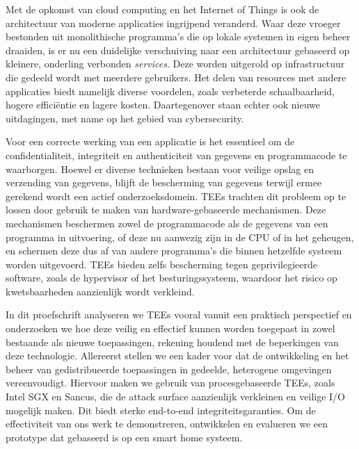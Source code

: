 Met de opkomst van cloud computing en het Internet of Things is ook de
architectuur van moderne applicaties ingrijpend veranderd. Waar deze vroeger
bestonden uit monolithische programma's die op lokale systemen in eigen beheer
draaiden, is er nu een duidelijke verschuiving naar een architectuur gebaseerd
op kleinere, onderling verbonden \emph{services}. Deze worden uitgerold op
infrastructuur die gedeeld wordt met meerdere gebruikers. Het delen van
resources met andere applicaties biedt namelijk diverse voordelen, zoals
verbeterde schaalbaarheid, hogere efficiëntie en lagere kosten. Daartegenover
staan echter ook nieuwe uitdagingen, met name op het gebied van cybersecurity.

Voor een correcte werking van een applicatie is het essentieel om de
confidentialiteit, integriteit en authenticiteit van gegevens en programmacode
te waarborgen. Hoewel er diverse technieken bestaan voor veilige opslag en
verzending van gegevens, blijft de bescherming van gegevens terwijl ermee
gerekend wordt een actief onderzoeksdomein. \acp{TEE} trachten dit probleem op
te lossen door gebruik te maken van hardware-gebaseerde mechanismen. Deze
mechanismen beschermen zowel de programmacode als de gegevens van een programma
in uitvoering, of deze nu aanwezig zijn in de CPU of in het geheugen, en
schermen deze dus af van andere programma's die binnen hetzelfde systeem worden
uitgevoerd. \acp{TEE} bieden zelfs bescherming tegen geprivilegieerde software,
zoals de hypervisor of het besturingssysteem, waardoor het risico op
kwetsbaarheden aanzienlijk wordt verkleind.

In dit proefschrift analyseren we \acp{TEE} vooral vanuit een praktisch
perspectief en onderzoeken we hoe deze veilig en effectief kunnen worden
toegepast in zowel bestaande als nieuwe toepassingen, rekening houdend met de
beperkingen van deze technologie. Allereerst stellen we een kader voor dat de
ontwikkeling en het beheer van gedistribueerde toepassingen in gedeelde,
heterogene omgevingen vereenvoudigt. Hiervoor maken we gebruik van
procesgebaseerde \acp{TEE}, zoals Intel \ac{SGX} en Sancus, die de attack
surface aanzienlijk verkleinen en veilige I/O mogelijk maken. Dit biedt sterke
end-to-end integriteitsgaranties. Om de effectiviteit van ons werk te
demonstreren, ontwikkelen en evalueren we een prototype dat gebaseerd is op een
smart home systeem.

